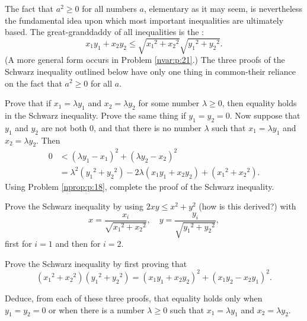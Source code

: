 \Newpage
\npropSqrtMultL*
\begin{problem} %
	\label{nprop:p:19}

	The fact that $a^2 \geq 0$ for all numbers $a$, elementary as it may seem, is nevertheless the fundamental idea upon which most important inequalities are ultimately based. The great-granddaddy of all inequalities is the :
	$$
		x_1 y_1 + x_2 y_2 \leq \sqrt{x_1{ }^2 + x_2{ }^2} \sqrt{y_1{ }^2 + y_2{ }^2}.
	$$
	(A more general form occurs in Problem \ref{nvar:p:21}.) The three proofs of the Schwarz inequality outlined below have only one thing in common-their reliance on the fact that $a^2 \geq 0$ for all $a$.

	\hfill

	\begin{lenumerate}
		\item \label{nprop:p:19:1}
		      Prove that if $x_1 = \lambda y_1$ and $x_2 = \lambda y_2$ for some number $\lambda \geq 0$, then equality holds in the Schwarz inequality. Prove the same thing if $y_1 = y_2 = 0$. Now suppose that $y_1$ and $y_2$ are not both 0, and that there is no number $\lambda$ such that $x_1 = \lambda y_1$ and $x_2 = \lambda y_2$. Then
		      \begin{align*}
			      0 & < (\lambda y_1 - x_1)^2 + (\lambda y_2 - x_2)^2                                            \\
			        & = \lambda^2 (y_1{ }^2 + y_2{ }^2) - 2 \lambda (x_1 y_1 + x_2 y_2) + (x_1{ }^2  +x_2{ }^2).
		      \end{align*}
		      Using Problem \ref{nprop:p:18}, complete the proof of the Schwarz inequality.
		\item \label{nprop:p:19:2}
		      Prove the Schwarz inequality by using $2 x y \leq x^2 + y^2$ (how is this derived?) with
		      $$
			      x = \frac{x_i}{\sqrt{x_1{ }^2 + x_2{ }^2}}, \quad y = \frac{y_i}{\sqrt{y_1{ }^2 + y_2{ }^2}},
		      $$
		      first for $i = 1$ and then for $i = 2$.
		\item \label{nprop:p:19:3}
		      Prove the Schwarz inequality by first proving that
		      $$
			      (x_1{ }^2 + x_2{ }^2)(y_1{ }^2 + y_2{ }^2) = (x_1 y_1 + x_2 y_2)^2 + (x_1 y_2 - x_2 y_1)^2.
		      $$
		\item \label{nprop:p:19:4}
		      Deduce, from each of these three proofs, that equality holds only when $y_1 = y_2 = 0$ or when there is a number $\lambda \geq 0$ such that $x_1 = \lambda y_1$ and $x_2 = \lambda y_2$.
	\end{lenumerate}
\end{problem}

